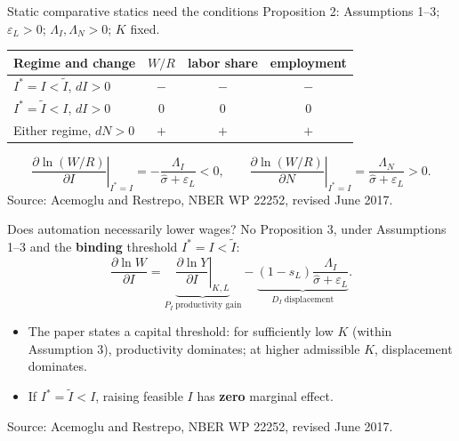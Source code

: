 \documentclass[aspectratio=169,11pt]{beamer}
\newcommand{\key}[1]{{\color{accent}\bfseries #1}}
\newcommand{\sourcefoot}{\vfill{\color{muted}\scriptsize Source: Acemoglu and Restrepo, NBER WP 22252, revised June 2017.}}
\begin{document}
\begin{frame}{Static comparative statics need the conditions}
\small Proposition 2: Assumptions 1--3; $\varepsilon_L>0$; $\Lambda_I,\Lambda_N>0$; $K$ fixed.
\vspace{0.4em}
\begin{center}
\begin{tabular}{p{4.3cm}ccc}
\toprule
Regime and change & $W/R$ & labor share & employment \\
\midrule
$I^*=I<\widetilde I$, $dI>0$ & $-$ & $-$ & $-$ \\
$I^*=\widetilde I<I$, $dI>0$ & $0$ & $0$ & $0$ \\
Either regime, $dN>0$ & $+$ & $+$ & $+$ \\
\bottomrule
\end{tabular}
\end{center}
\[
\left.\frac{\partial\ln(W/R)}{\partial I}\right|_{I^*=I}
=-\frac{\Lambda_I}{\widehat\sigma+\varepsilon_L}<0,
\qquad
\left.\frac{\partial\ln(W/R)}{\partial N}\right|_{I^*=I}
=\frac{\Lambda_N}{\widehat\sigma+\varepsilon_L}>0.
\]
\sourcefoot
\end{frame}

\begin{frame}{Does automation necessarily lower wages? No}
\small Proposition 3, under Assumptions 1--3 and the \key{binding} threshold $I^*=I<\widetilde I$:
\[
\frac{\partial\ln W}{\partial I}
=\underbrace{\left.\frac{\partial\ln Y}{\partial I}\right|_{K,L}}_{P_I\;\text{productivity gain}}
-\underbrace{(1-s_L)\frac{\Lambda_I}{\widehat\sigma+\varepsilon_L}}_{D_I\;\text{displacement}}.
\]
\begin{center}
\end{center}
\begin{itemize}
\item The paper states a capital threshold: for sufficiently low $K$ (within Assumption 3), productivity dominates; at higher admissible $K$, displacement dominates.
\item If $I^*=\widetilde I<I$, raising feasible $I$ has \key{zero} marginal effect.
\end{itemize}
\sourcefoot
\end{frame}
\end{document}
